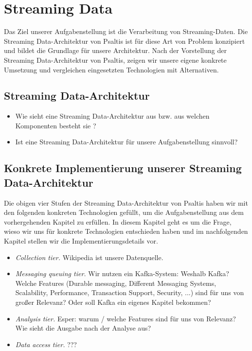\section{Streaming Data}

Das Ziel unserer Aufgabenstellung ist die Verarbeitung von Streaming-Daten. Die Streaming Data-Architektur
von Psaltis \cite{psaltis2017streaming} ist für diese Art von Problem konzipiert und bildet die Grundlage für
unsere Architektur. Nach der Vorstellung der Streaming Data-Architektur von Psaltis, zeigen wir unsere eigene konkrete
Umsetzung und vergleichen eingesetzten Technologien mit Alternativen.

\subsection{Streaming Data-Architektur}
\begin{itemize}
    \item Wie sieht eine Streaming Data-Architektur aus bzw. aus welchen Komponenten besteht sie \cite{psaltis2017streaming}?
    \item Ist eine Streaming Data-Architektur für unsere Aufgabenstellung sinnvoll?
\end{itemize}

\subsection{Konkrete Implementierung unserer Streaming Data-Architektur}
Die obigen vier Stufen der Streaming Data-Architektur von Psaltis \cite{psaltis2017streaming}
haben wir mit den folgenden konkreten Technologien gefüllt, um die Aufgabenstellung aus dem vorhergehenden Kapitel zu erfüllen.
In diesem Kapitel geht es um die Frage, wieso wir uns für konkrete Technologien entschieden haben und im nachfolgenden Kapitel
stellen wir die Implementierungsdetails vor.
\begin{itemize}
    \item \textit{Collection tier.} Wikipedia ist unsere Datenquelle.
    \item \textit{Messaging queuing tier.} Wir nutzen ein Kafka-System: Weshalb Kafka? Welche Features
        (Durable messaging, Different Messaging Systems, Scalability, Performance, Transaction Support, Security, ...) sind für uns von großer Relevanz?
        Oder soll Kafka ein eigenes Kapitel bekommen?
    \item \textit{Analysis tier.} Esper: warum / welche Features sind für uns von Relevanz? Wie sieht die Ausgabe nach der Analyse aus?
    \item \textit{Data access tier.} ???
\end{itemize}